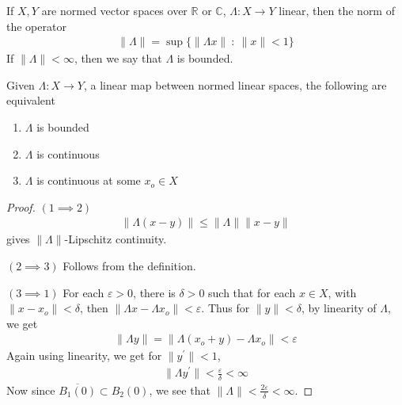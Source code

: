 \begin{definition}
  If $X, Y$ are normed vector spaces over $\mathbb{R}$ or
  $\mathbb{C}$, $\Lambda: X \to Y$ linear, then the norm of the operator
  \begin{align*}
    \|\Lambda\| = \sup \{ \|\Lambda x\|  \ : \  \|x\|< 1 \}
  \end{align*}
  If $\|\Lambda\| < \infty$, then we say that $\Lambda$ is bounded.
\end{definition}

\begin{proposition}
  Given $\Lambda: X \to Y$, a linear map between normed linear
  spaces, the following are equivalent
  \begin{enumerate}[label=(\arabic*)]
    \item $\Lambda$ is bounded
    \item $\Lambda$ is continuous
    \item $\Lambda$ is continuous at some $x_o \in X$
  \end{enumerate}
\end{proposition}
\begin{proof}
  $(1 \implies 2)$
  \begin{align*}
    \|\Lambda(x - y)\| \le \|\Lambda\| \|x - y\|
  \end{align*}
  gives $\|\Lambda\|$-Lipschitz continuity.

  $(2 \implies 3)$ Follows from the definition.

  $(3 \implies 1)$ For each $\varepsilon > 0$, there is $\delta > 0$
  such that for each $x \in X$, with $\|x - x_o\| < \delta$, then
  $\|\Lambda x - \Lambda x_o\| < \varepsilon$.
  Thus for $ \|y \| < \delta$,  by linearity of $\Lambda$, we get
  \begin{align*}
    \|\Lambda y\| = \|\Lambda(x_o + y) - \Lambda x_o\| < \varepsilon
  \end{align*}
  Again using linearity, we get for $\|y^\prime\| < 1$,
  \begin{align*}
    \|\Lambda y^\prime\| < \frac{\varepsilon}{\delta} < \infty
  \end{align*}
  Now since $\overline{ B_1(0)} \subset B_2(0)$, we see that
  $\|\Lambda\| < \frac{2\varepsilon}{\delta} < \infty$.
\end{proof}

